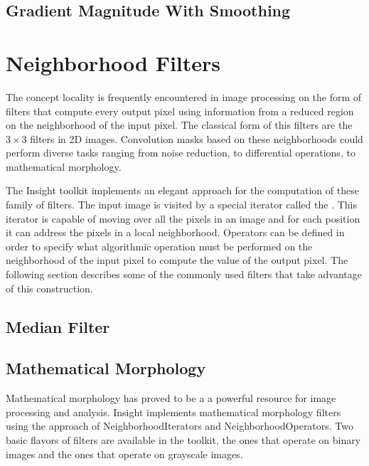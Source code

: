 %

\subsection{Gradient Magnitude With Smoothing}
\label{sec:GradientMagnitudeRecursiveGaussianImageFilter}

%




\section{Neighborhood Filters}
\label{sec:NeighborhoodFilters}

The concept locality is frequently encountered in image processing on the form
of filters that compute every output pixel using information from a reduced
region on the neighborhood of the input pixel. The classical form of this
filters are the $3 \times 3$ filters in 2D images. Convolution masks based on
these neighborhoods could perform diverse tasks ranging from noise reduction,
to differential operations, to mathematical morphology.

The Insight toolkit implements an elegant approach for the computation of these
family of filters. The input image is visited by a special iterator called the
. This iterator is capable of moving over all
the pixels in an image and for each position it can address the pixels in a
local neighborhood. Operators can be defined in order to specify what
algorithmic operation must be performed on the neighborhood of the input pixel
to compute the value of the output pixel. The following section describes some
of the commonly used filters that take advantage of this construction.  

\subsection{Median Filter}
\label{sec:MedianFilter}

%


\subsection{Mathematical Morphology}
\label{sec:MathematicalMorphology}

Mathematical morphology has proved to be a a powerful resource for image
processing and analysis. Insight implements mathematical morphology filters
using the approach of NeighborhoodIterators and NeighborhoodOperators. Two
basic flavors of filters are available in the toolkit, the ones that operate on
binary images and the ones that operate on grayscale images. 

